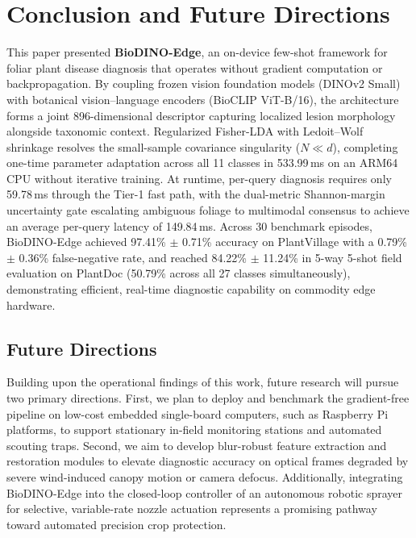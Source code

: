 \documentclass[preprint,12pt]{elsarticle}
\begin{document}
\section{Conclusion and Future Directions}
\label{sec:conclusion}

This paper presented \textbf{BioDINO-Edge}, an on-device few-shot framework for foliar plant disease diagnosis that operates without gradient computation or backpropagation. By coupling frozen vision foundation models (DINOv2 Small) with botanical vision--language encoders (BioCLIP ViT-B/16), the architecture forms a joint 896-dimensional descriptor capturing localized lesion morphology alongside taxonomic context. Regularized Fisher-LDA with Ledoit--Wolf shrinkage resolves the small-sample covariance singularity ($N \ll d$), completing one-time parameter adaptation across all 11 classes in 533.99\,ms on an ARM64 CPU without iterative training. At runtime, per-query diagnosis requires only 59.78\,ms through the Tier-1 fast path, with the dual-metric Shannon-margin uncertainty gate escalating ambiguous foliage to multimodal consensus to achieve an average per-query latency of 149.84\,ms. Across 30 benchmark episodes, BioDINO-Edge achieved 97.41\% $\pm$ 0.71\% accuracy on PlantVillage with a 0.79\% $\pm$ 0.36\% false-negative rate, and reached 84.22\% $\pm$ 11.24\% in 5-way 5-shot field evaluation on PlantDoc (50.79\% across all 27 classes simultaneously), demonstrating efficient, real-time diagnostic capability on commodity edge hardware.

\subsection{Future Directions}
Building upon the operational findings of this work, future research will pursue two primary directions. First, we plan to deploy and benchmark the gradient-free pipeline on low-cost embedded single-board computers, such as Raspberry Pi platforms, to support stationary in-field monitoring stations and automated scouting traps. Second, we aim to develop blur-robust feature extraction and restoration modules to elevate diagnostic accuracy on optical frames degraded by severe wind-induced canopy motion or camera defocus. Additionally, integrating BioDINO-Edge into the closed-loop controller of an autonomous robotic sprayer for selective, variable-rate nozzle actuation represents a promising pathway toward automated precision crop protection.

\end{document}

